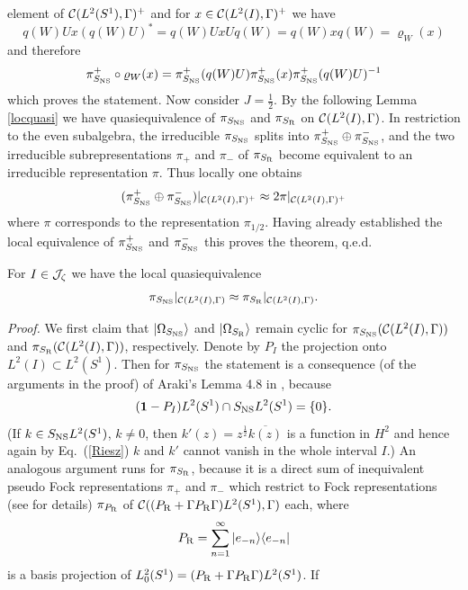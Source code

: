 \documentclass[10pt,a4paper]{article}
\begin{document}
element of ${\cal C}(L^2(S^1),\Gamma)^+$ and for
$x\in{\cal C}(L^2(I),\Gamma)^+$ we have
\[q(W)Ux(q(W)U)^*=q(W)UxUq(W)=q(W)xq(W)=\varrho_W(x)\]
and therefore
\[ \pi_{S_{\rm NS}}^+\circ\varrho_W(x)=\pi_{S_{\rm NS}}^+
(q(W)U)\pi_{S_{\rm NS}}^+(x)\pi_{S_{\rm NS}}^+(q(W)U)^{-1} \]
which proves the statement. Now consider
$J=\frac{1}{2}$. By the following Lemma \ref{locquasi}
we have quasiequivalence of $\pi_{S_{\rm NS}}$ and
$\pi_{S_{\rm R}}$ on ${\cal C}(L^2(I),\Gamma)$. In
restriction to the even subalgebra, the irreducible
$\pi_{S_{\rm NS}}$ splits into
$\pi_{S_{\rm NS}}^+\oplus\pi_{S_{\rm NS}}^-$, and the two
irreducible subrepresentations $\pi_+$ and $\pi_-$
of $\pi_{S_{\rm R}}$ become equivalent to an irreducible
representation $\pi$.
Thus locally one obtains
\[ (\pi_{S_{\rm NS}}^+\oplus\pi_{S_{\rm NS}}^-)
|_{{\cal C}(L^2(I),\Gamma)^+} \approx 2\pi
|_{{\cal C}(L^2(I),\Gamma)^+} \]
where $\pi$ corresponds to the representation
$\pi_{1/2}$. Having already established the local
equivalence of $\pi_{S_{\rm NS}}^+$ and $\pi_{S_{\rm NS}}^-$
this proves the theorem, q.e.d.
\begin{lemma}
\label{locquasi}
For $I\in{\cal J}_\zeta$ we have the local
quasiequivalence
\begin{equation}
\pi_{S_{\rm NS}}|_{{\cal C}(L^2(I),\Gamma)}
\approx \pi_{S_{\rm R}}|_{{\cal C}(L^2(I),\Gamma)}.
\end{equation}
\end{lemma}
{\it Proof.} We first claim that
$|\Omega_{S_{\rm NS}}\rangle$
and $|\Omega_{S_{\rm R}}\rangle$ remain cyclic for
$\pi_{S_{\rm NS}}({\cal C}(L^2(I),\Gamma))$ and
$\pi_{S_{\rm R}}({\cal C}(L^2(I),\Gamma))$, respectively.
Denote by $P_I$ the projection onto
$L^2(I)\subset L^2(S^1)$. Then for $\pi_{S_{\rm NS}}$ the
statement is a consequence (of the arguments in the proof)
of Araki's Lemma 4.8 in \cite{Ara1}, because
\[ ({\bf 1}-P_I) L^2(S^1) \cap S_{\rm NS} L^2(S^1) =
\{0\}. \]
(If $k\in S_{\rm NS}L^2(S^1)$, $k\neq 0$, then
$k'(z)=z^\frac{1}{2}\overline{k(z)}$ is a function
in $H^2$ and hence again by Eq.~(\ref{Riesz})
$k$ and $k'$ cannot vanish in the whole interval $I$.)
An analogous argument runs for $\pi_{S_{\rm R}}$, because
it is a direct sum of inequivalent pseudo Fock
representations $\pi_+$ and $\pi_-$ which restrict
to Fock representations (see \cite{Ara1} for details)
$\pi_{P_{\rm R}}$ of ${\cal C}((P_{\rm R}+\Gamma P_{\rm R}\Gamma)
L^2(S^1),\Gamma)$ each, where
\[ P_{\rm R}=\sum_{n=1}^\infty |e_{-n}\rangle\langle e_{-n}|\]
is a basis projection of
$L_0^2(S^1)=(P_{\rm R}+\Gamma P_{\rm R}\Gamma)L^2(S^1)$. If
\end{document}
